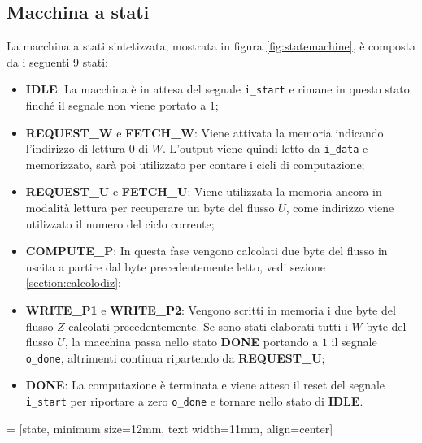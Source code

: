 
\subsection{Macchina a stati}

La macchina a stati sintetizzata, mostrata in figura \ref{fig:statemachine}, è composta da i seguenti 9 stati:

\begin{itemize}
    \item \textbf{IDLE}: La macchina è in attesa del segnale \verb|i_start| e rimane in questo stato finché il segnale non viene portato a $1$;
    \item \textbf{REQUEST\_W} e \textbf{FETCH\_W}: Viene attivata la memoria indicando l'indirizzo di lettura $0$ di $W$. L'output viene quindi letto da \verb|i_data| e memorizzato, sarà poi utilizzato per contare i cicli di computazione;
    \item \textbf{REQUEST\_U} e \textbf{FETCH\_U}: Viene utilizzata la memoria ancora in modalità lettura per recuperare un byte del flusso $U$, come indirizzo viene utilizzato il numero del ciclo corrente;
    \item \textbf{COMPUTE\_P}: In questa fase vengono calcolati due byte del flusso in uscita a partire dal byte precedentemente letto, vedi sezione \ref{section:calcolodiz};
    \item \textbf{WRITE\_P1} e \textbf{WRITE\_P2}: Vengono scritti in memoria i due byte del flusso $Z$ calcolati precedentemente. Se sono stati elaborati tutti i $W$ byte del flusso $U$, la macchina passa nello stato \textbf{DONE} portando a $1$ il segnale \verb|o_done|, altrimenti continua ripartendo da \textbf{REQUEST\_U};
    \item \textbf{DONE}: La computazione è terminata e viene atteso il reset del segnale \verb|i_start| per riportare a zero \verb|o_done| e tornare nello stato di \textbf{IDLE}.
\end{itemize}

 = [state, minimum size=12mm, text width=11mm, align=center]

